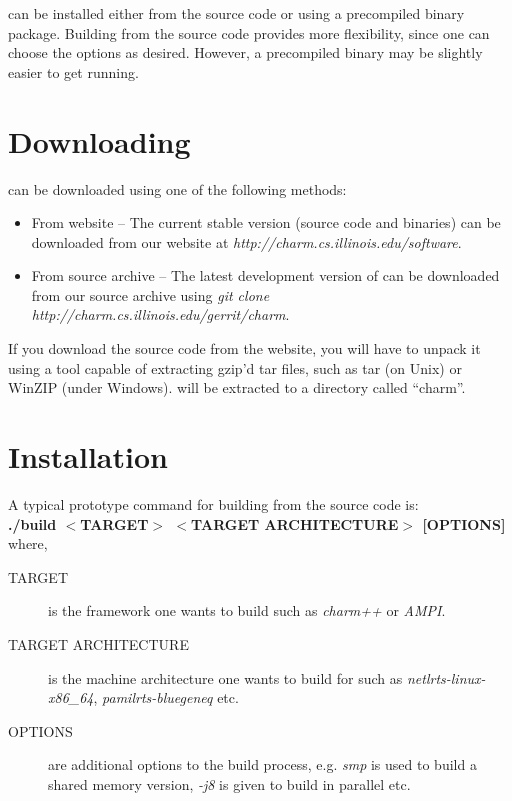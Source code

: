 \charmpp{} can be installed either from the source code or using a precompiled
binary package. Building from the source code provides more flexibility, since one 
can choose the options as desired. However, a precompiled binary may be slightly
easier to get running.
 
\section{Downloading \charmpp{}}

\charmpp{} can be downloaded using one of the following methods:

\begin{itemize}
\item From \charmpp{} website -- The current stable version (source code and
binaries) can be downloaded from our website at {\em http://charm.cs.illinois.edu/software}.
\item From source archive -- The latest development version of \charmpp{} can be downloaded
from our source archive using {\em git clone http://charm.cs.illinois.edu/gerrit/charm}.
\end{itemize}

If you download the source code from the website, you will have to unpack it 
using a tool capable of extracting gzip'd tar files, such as tar (on Unix) 
or WinZIP (under Windows).  \charmpp{} will be extracted to a directory 
called ``charm''. 

\section{Installation}

A typical prototype command for building \charmpp{} from the source code is:
\vspace{5pt}\\
{\bf ./build $<$TARGET$>$ $<$TARGET ARCHITECTURE$>$ [OPTIONS]} where,

\begin{description}
\item [TARGET] is the framework one wants to build such as {\em charm++} or {\em
AMPI}.
\item [TARGET ARCHITECTURE] is the machine architecture one wants to build for
such as {\em netlrts-linux-x86\_64}, {\em pamilrts-bluegeneq} etc.
\item [OPTIONS] are additional options to the build process, e.g. {\em smp} is
used to build a shared memory version, {\em -j8} is given to build in parallel
etc.
\end {description}

